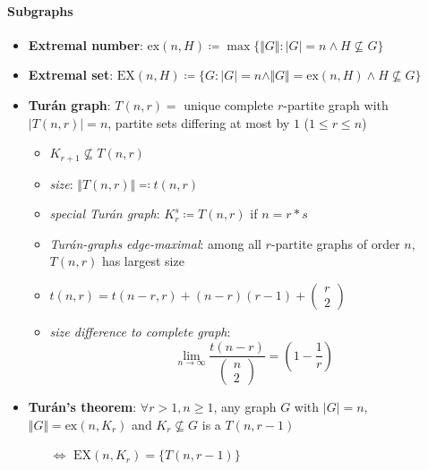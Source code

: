 \paragraph{Subgraphs}
\begin{itemize}
  \item \textbf{Extremal number}: $ \text{ex}(n,H) \coloneqq \max\{ \Vert G \Vert : \vert G \vert = n \wedge H \not \subseteq G \} $
  \item \textbf{Extremal set}: $ \text{EX}(n,H) \coloneqq \{ G : \vert G \vert = n \wedge \Vert G \Vert = \text{ex}(n,H) \wedge H \not \subseteq G \} $
  \item \textbf{Turán graph}: $ T(n,r) = $ unique complete $ r $-partite graph with $ \vert T(n,r) \vert = n $, partite sets differing at most by $ 1 $ ($ 1 \leq r \leq n $)
  \begin{itemize}
    \item $ K_{r+1} \not \subseteq T(n,r) $
    \item \emph{size}: $ \Vert T(n,r) \Vert \eqqcolon t(n,r) $ 
    \item \emph{special Turán graph}: $ K_r^s \coloneqq T(n,r) $ if $ n = r*s $
    \item \emph{Turán-graphs edge-maximal}: among all $ r $-partite graphs of order $ n $, $ T(n,r) $ has largest size
    \item $ t(n,r) = t(n-r,r) + (n-r)(r-1) + \left( \begin{smallmatrix}
      r \\ 2
    \end{smallmatrix} \right) $
    \item \emph{size difference to complete graph}:
    \begin{equation*}
      \lim_{n \to \infty} \frac{t(n-r)}{\left( \begin{smallmatrix}
        n \\ 2
      \end{smallmatrix} \right)} = \left( 1 - \frac{1}{r} \right)
    \end{equation*}
  \end{itemize}
  \item \textbf{Turán's theorem}: $ \forall r > 1, n \geq 1 $, any graph $ G $ with $ \vert G \vert = n $, $ \Vert G \Vert = \text{ex}(n,K_r) $ and $ K_r \not \subseteq G $ is a $ T(n,r-1) $
  \begin{itemize}
    \item[$ \Leftrightarrow $] $ \text{EX}(n,K_r) = \{ T(n,r-1) \} $ 
  \end{itemize}

\end{itemize}
